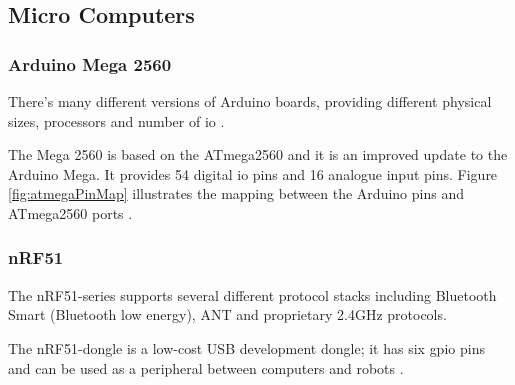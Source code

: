 \subsection{Micro Computers}
\subsubsection{Arduino Mega 2560}
There's many different versions of Arduino boards, providing different physical sizes, processors and number of \acrfull{io} \cite{arduinoboards}. 

The Mega 2560 is based on the ATmega2560 and it is an improved update to the Arduino Mega. It provides 54 digital \acrshort{io} pins and 16 analogue input pins. Figure \ref{fig:atmegaPinMap} illustrates the mapping between the Arduino pins and ATmega2560 ports \cite{arduinomega2560}. 


\subsubsection{nRF51}
The nRF51-series supports several different protocol stacks including Bluetooth Smart (Bluetooth low energy), ANT and proprietary 2.4GHz protocols. 

The nRF51-dongle is a low-cost USB development dongle; it has six \acrfull{gpio} pins and can be used as a peripheral between computers and robots \cite{nrf51Dongle}.


